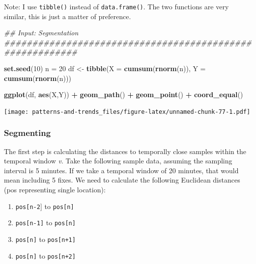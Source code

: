 \documentclass[]{book}
\newenvironment{Shaded}{\begin{snugshade}}{\end{snugshade}}
\newcommand{\CommentTok}[1]{\textcolor[rgb]{0.56,0.35,0.01}{\textit{#1}}}
\newcommand{\DataTypeTok}[1]{\textcolor[rgb]{0.13,0.29,0.53}{#1}}
\newcommand{\DecValTok}[1]{\textcolor[rgb]{0.00,0.00,0.81}{#1}}
\newcommand{\KeywordTok}[1]{\textcolor[rgb]{0.13,0.29,0.53}{\textbf{#1}}}
\newcommand{\NormalTok}[1]{#1}
\newcommand{\OperatorTok}[1]{\textcolor[rgb]{0.81,0.36,0.00}{\textbf{#1}}}
\newcommand{\StringTok}[1]{\textcolor[rgb]{0.31,0.60,0.02}{#1}}
\providecommand{\tightlist}{%
  \setlength{\itemsep}{0pt}\setlength{\parskip}{0pt}}
\begin{document}
Note: I use \texttt{tibble()} instead of \texttt{data.frame()}. The two functions are very similar, this is just a matter of preference.

\begin{Shaded}
\begin{Highlighting}[]

\CommentTok{## Input: Segmentation #########################################################}


\KeywordTok{set.seed}\NormalTok{(}\DecValTok{10}\NormalTok{)}
\NormalTok{n =}\StringTok{ }\DecValTok{20}
\NormalTok{df <-}\StringTok{ }\KeywordTok{tibble}\NormalTok{(}\DataTypeTok{X =} \KeywordTok{cumsum}\NormalTok{(}\KeywordTok{rnorm}\NormalTok{(n)), }\DataTypeTok{Y =} \KeywordTok{cumsum}\NormalTok{(}\KeywordTok{rnorm}\NormalTok{(n)))}

\KeywordTok{ggplot}\NormalTok{(df, }\KeywordTok{aes}\NormalTok{(X,Y)) }\OperatorTok{+}
\StringTok{  }\KeywordTok{geom_path}\NormalTok{() }\OperatorTok{+}\StringTok{ }
\StringTok{  }\KeywordTok{geom_point}\NormalTok{() }\OperatorTok{+}
\StringTok{  }\KeywordTok{coord_equal}\NormalTok{()}
\end{Highlighting}
\end{Shaded}

\texttt{[image: patterns-and-trends\_files/figure-latex/unnamed-chunk-77-1.pdf]}

\hypertarget{segmenting}{%
\subsubsection{Segmenting}\label{segmenting}}

The first step is calculating the distances to temporally close samples within the temporal window \emph{v}. Take the following sample data, assuming the sampling interval is 5 minutes. If we take a temporal window of 20 minutes, that would mean including 5 fixes. We need to calculate the following Euclidean distances (pos representing single location):

\begin{enumerate}
\def\labelenumi{\arabic{enumi}.}
\tightlist
\item
  \texttt{pos{[}n-2}{]} to \texttt{pos{[}n{]}}
\item
  \texttt{pos{[}n-1{]}} to \texttt{pos{[}n{]}}
\item
  \texttt{pos{[}n{]}} to \texttt{pos{[}n+1{]}}
\item
  \texttt{pos{[}n{]}} to \texttt{pos{[}n+2{]}}
\end{enumerate}
\end{document}
